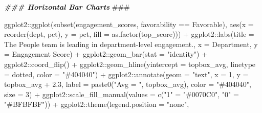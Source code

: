 \documentclass[
]{book}
\newenvironment{Shaded}{\begin{snugshade}}{\end{snugshade}}
\newcommand{\AlertTok}[1]{\textcolor[rgb]{0.94,0.16,0.16}{#1}}
\newcommand{\AttributeTok}[1]{\textcolor[rgb]{0.77,0.63,0.00}{#1}}
\newcommand{\DecValTok}[1]{\textcolor[rgb]{0.00,0.00,0.81}{#1}}
\newcommand{\DocumentationTok}[1]{\textcolor[rgb]{0.56,0.35,0.01}{\textbf{\textit{#1}}}}
\newcommand{\FloatTok}[1]{\textcolor[rgb]{0.00,0.00,0.81}{#1}}
\newcommand{\FunctionTok}[1]{\textcolor[rgb]{0.00,0.00,0.00}{#1}}
\newcommand{\NormalTok}[1]{#1}
\newcommand{\OtherTok}[1]{\textcolor[rgb]{0.56,0.35,0.01}{#1}}
\newcommand{\SpecialCharTok}[1]{\textcolor[rgb]{0.00,0.00,0.00}{#1}}
\newcommand{\StringTok}[1]{\textcolor[rgb]{0.31,0.60,0.02}{#1}}
\begin{document}
\begin{Shaded}
\begin{Highlighting}[]
\DocumentationTok{\#\#\# Horizontal Bar Charts }\AlertTok{\#\#\#}

\NormalTok{ggplot2}\SpecialCharTok{::}\FunctionTok{ggplot}\NormalTok{(}\FunctionTok{subset}\NormalTok{(engagement\_scores, favorability }\SpecialCharTok{==} \StringTok{\textquotesingle{}Favorable\textquotesingle{}}\NormalTok{), }\FunctionTok{aes}\NormalTok{(}\AttributeTok{x =} \FunctionTok{reorder}\NormalTok{(dept, pct), }\AttributeTok{y =}\NormalTok{ pct, }\AttributeTok{fill =} \FunctionTok{as.factor}\NormalTok{(top\_score))) }\SpecialCharTok{+}
\NormalTok{ggplot2}\SpecialCharTok{::}\FunctionTok{labs}\NormalTok{(}\AttributeTok{title =} \StringTok{\textquotesingle{}The People team is leading in department{-}level engagement.\textquotesingle{}}\NormalTok{, }\AttributeTok{x =} \StringTok{\textquotesingle{}Department\textquotesingle{}}\NormalTok{, }\AttributeTok{y =} \StringTok{\textquotesingle{}Engagement Score\textquotesingle{}}\NormalTok{) }\SpecialCharTok{+}
\NormalTok{ggplot2}\SpecialCharTok{::}\FunctionTok{geom\_bar}\NormalTok{(}\AttributeTok{stat =} \StringTok{"identity"}\NormalTok{) }\SpecialCharTok{+}
\NormalTok{ggplot2}\SpecialCharTok{::}\FunctionTok{coord\_flip}\NormalTok{() }\SpecialCharTok{+}
\NormalTok{ggplot2}\SpecialCharTok{::}\FunctionTok{geom\_hline}\NormalTok{(}\AttributeTok{yintercept =}\NormalTok{ topbox\_avg, }\AttributeTok{linetype =} \StringTok{\textquotesingle{}dotted\textquotesingle{}}\NormalTok{, }\AttributeTok{color =} \StringTok{"\#404040"}\NormalTok{) }\SpecialCharTok{+} 
\NormalTok{ggplot2}\SpecialCharTok{::}\FunctionTok{annotate}\NormalTok{(}\AttributeTok{geom =} \StringTok{"text"}\NormalTok{, }\AttributeTok{x =} \DecValTok{1}\NormalTok{, }\AttributeTok{y =}\NormalTok{ topbox\_avg }\SpecialCharTok{+} \FloatTok{2.3}\NormalTok{, }\AttributeTok{label =} \FunctionTok{paste0}\NormalTok{(}\StringTok{"Avg = "}\NormalTok{, topbox\_avg), }\AttributeTok{color =} \StringTok{"\#404040"}\NormalTok{, }\AttributeTok{size =} \DecValTok{3}\NormalTok{) }\SpecialCharTok{+}
\NormalTok{ggplot2}\SpecialCharTok{::}\FunctionTok{scale\_fill\_manual}\NormalTok{(}\AttributeTok{values =} \FunctionTok{c}\NormalTok{(}\StringTok{"1"} \OtherTok{=} \StringTok{"\#0070C0"}\NormalTok{,}
                                      \StringTok{"0"} \OtherTok{=} \StringTok{"\#BFBFBF"}\NormalTok{)) }\SpecialCharTok{+}
\NormalTok{ggplot2}\SpecialCharTok{::}\FunctionTok{theme}\NormalTok{(}\AttributeTok{legend.position =} \StringTok{"none"}\NormalTok{,}

\end{Highlighting}
\end{Shaded}
\end{document}

